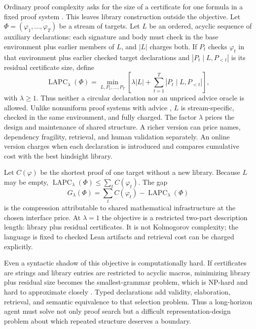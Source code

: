 \documentclass[10pt]{article}
\newcommand{\LAPC}{\operatorname{LAPC}}
\begin{document}
Ordinary proof complexity asks for the size of a certificate for one formula in a fixed proof
system \citep{cook1979,krajicek1995}.  This leaves library construction outside the objective.  Let
$\Phi=(\varphi_1,\ldots,\varphi_T)$ be a stream of targets.  Let $L$ be an ordered, acyclic sequence
of auxiliary declarations: each signature and body must check in the base environment plus earlier
members of $L$, and $|L|$ charges both.  If $P_t$ checks $\varphi_t$ in that environment plus earlier
checked target declarations and
$|P_t\mid L,P_{<t}|$ is its residual certificate size, define
\begin{equation}
 \LAPC_\lambda(\Phi)=
 \min_{L,P_1,\ldots,P_T}
 \left[\lambda |L|+\sum_{t=1}^T |P_t\mid L,P_{<t}|\right],
 \label{eq:apc}
\end{equation}
with $\lambda\geq 1$.  Thus neither a circular declaration nor an unpriced advice oracle is allowed.
Unlike nonuniform proof systems with advice \citep{beyersdorff2011}, $L$ is stream-specific,
checked in the same environment, and fully charged.  The factor $\lambda$ prices the design and maintenance of shared structure.  A richer version can price names,
dependency fragility, retrieval, and human validation separately.  An online version charges when
each declaration is introduced and compares cumulative cost with the best hindsight library.

Let $C(\varphi)$ be the shortest proof of one target without a new library.  Because $L$ may be
empty, $\LAPC_\lambda(\Phi)\leq\sum_t C(\varphi_t)$.  The gap
\begin{equation}
 G_\lambda(\Phi)=\sum_t C(\varphi_t)-\LAPC_\lambda(\Phi)
 \label{eq:gain}
\end{equation}
is the compression attributable to shared mathematical infrastructure at the chosen interface
price.  At $\lambda=1$ the objective is a restricted two-part description length: library plus
residual certificates.  It is not Kolmogorov complexity; the language is fixed to checked Lean
artifacts and retrieval cost can be charged explicitly.

Even a syntactic shadow of this objective is computationally hard.  If certificates are strings
and library entries are restricted to acyclic macros, minimizing library plus residual size becomes
the smallest-grammar problem, which is NP-hard and hard to approximate closely
\citep{charikar2005}.  Typed declarations add validity, elaboration, retrieval, and semantic
equivalence to that selection problem.  Thus a long-horizon agent must solve not only proof search
but a difficult representation-design problem about which repeated structure deserves a boundary.
\end{document}

